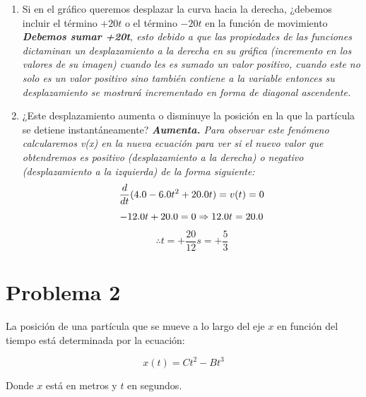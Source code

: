 \documentclass{article}
\begin{document}
\begin{enumerate}
  
  \item Si en el gráfico queremos desplazar la curva hacia la derecha, ¿debemos incluir el término \(+20t\) o el término \(-20t\) en la función de movimiento\\
  \textit{\textbf{Debemos sumar +20t}, esto debido a que las propiedades de las funciones dictaminan un desplazamiento a la derecha en su gráfica (incremento en los valores de su imagen) cuando les es sumado un valor positivo, cuando este no solo es un valor positivo sino también contiene a la variable entonces su desplazamiento se mostrará incrementado en forma de diagonal ascendente.}
  
  \item ¿Este desplazamiento aumenta o disminuye la posición en la que la partícula se detiene instantáneamente?
  \textit{\textbf{Aumenta.} Para observar este fenómeno calcularemos v(x) en la nueva ecuación para ver si el nuevo valor que obtendremos es positivo (desplazamiento a la derecha) o negativo (desplazamiento a la izquierda) de la forma siguiente:}
  \[\frac{d}{dt}(4.0 - 6.0t^2 + 20.0t) = v(t) = 0 \\\]
  \[-12.0t + 20.0 = 0 \Rightarrow 12.0t = 20.0 \\\]
  \[\therefore t = +\frac{20}{12}s = + \frac{5}{3}\]
\end{enumerate}

\section*{Problema 2}

La posición de una partícula que se mueve a lo largo del eje \(x\) en función del tiempo está determinada por la ecuación:

\[x(t) = Ct^2 - Bt^3\]

\noindent Donde \(x\) está en metros y \(t\) en segundos.
\end{document}
